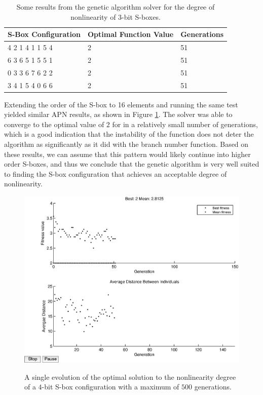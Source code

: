 \documentclass[11pt]{article}
\begin{document}
\begin{table}
	\centering
	\caption{Some results from the genetic algorithm solver for the degree of nonlinearity of $3$-bit S-boxes.}
	\label{nlTable}
    \begin{tabular}{|l|l|l|}
        \hline
        S-Box Configuration & Optimal Function Value & Generations \\ \hline
        4     2     1     4     1     1     5     4 & 2 & 51 \\ 
        6     3     6     5     1     5     5     1 & 2 & 51 \\ 
        0     3     3     6     7     6     2     2 & 2 & 51 \\ 
        3     4     1     5     4     0     6     6 & 2 & 51 \\ 
        \hline
    \end{tabular}
\end{table}

Extending the order of the S-box to 16 elements and running the same test yielded similar APN results, as shown in Figure \ref{nl16}. The solver was able to converge to the optimal value of $2$ for in a relatively small number of generations, which is a good indication that the instability of the function does not deter the algorithm as significantly as it did with the branch number function. Based on these results, we can assume that this pattern would likely continue into higher order S-boxes, and thus we conclude that the genetic algorithm is very well suited to finding the S-box configuration that achieves an acceptable degree of nonlinearity.

\begin{figure}[!ht]
	\centering
	\includegraphics[scale=0.5]{images/nl_results16.eps} \\
	\label{nl16}
\caption{A single evolution of the optimal solution to the nonlinearity degree of a $4$-bit S-box configuration with a maximum of $500$ generations.}
\end{figure}
\end{document}

